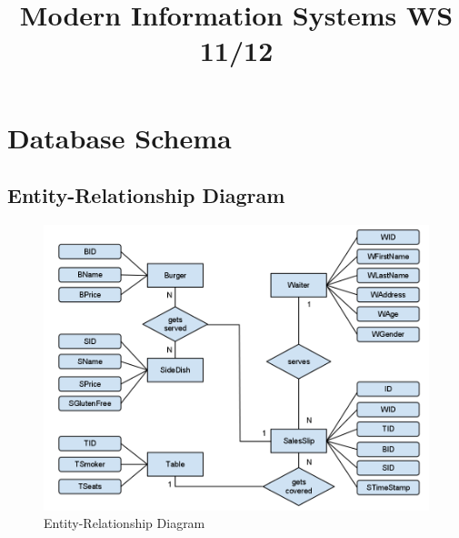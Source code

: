 \documentclass[10pt, a4paper]{article}
\author{\AuthorFront}
\date{} %
\title{Modern Information Systems WS 11/12}
\begin{document}

\newcommand{\abc}{\item[\alph{ale})]\stepcounter{ale}}
\newenvironment{liste}{\begin{itemize}}{\end{itemize}}
\newcommand{\aliste}{\begin{liste} \setcounter{ale}{1}}
\newcommand{\zliste}{\end{liste}}
\newenvironment{abcliste}{\aliste}{\zliste}


\maketitle
\thispagestyle{fancy}


\tableofcontents
\pagebreak

\section{Database Schema}

\subsection{Entity-Relationship Diagram}

\begin{figure}[htb]
	\centering
	\includegraphics[scale=0.49]{fig/entity_relationship_diagram.png}
	\caption{Entity-Relationship Diagram}
\end{figure}
\end{document}
